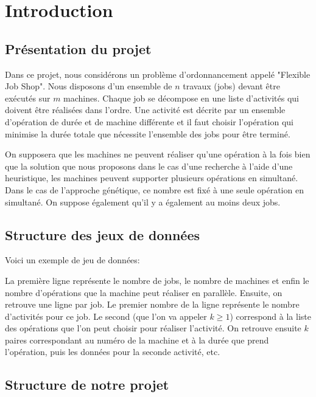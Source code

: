 \section{Introduction}

\subsection{Présentation du projet}

Dans ce projet, nous considérons un problème d'ordonnancement appelé "Flexible Job Shop". Nous disposons d'un ensemble de $n$ travaux (jobs) devant être exécutés sur $m$ machines. Chaque job se décompose en une liste d'activités qui doivent être réalisées dans l'ordre. Une activité est décrite par un ensemble d'opération de durée et de machine différente et il faut choisir l'opération qui minimise la durée totale que nécessite l'ensemble des jobs pour être terminé.

On supposera que les machines ne peuvent réaliser qu'une opération à la fois bien que la solution que nous proposons dans le cas d'une recherche à l'aide d'une heuristique, les machines peuvent supporter plusieurs opérations en simultané. Dans le cas de l'approche génétique, ce nombre est fixé à une seule opération en simultané. On suppose également qu'il y a également au moins deux jobs.

\subsection{Structure des jeux de données}

Voici un exemple de jeu de données:


La première ligne représente le nombre de jobs, le nombre de machines et enfin le nombre d'opérations que la machine peut réaliser en parallèle. Ensuite, on retrouve une ligne par job. Le premier nombre de la ligne représente le nombre d'activités pour ce job. Le second (que l'on va appeler $k \geq 1$) correspond à la liste des opérations que l'on peut choisir pour réaliser l'activité. On retrouve ensuite $k$ paires correspondant au numéro de la machine et à la durée que prend l'opération, puis les données pour la seconde activité, etc. 

\subsection{Structure de notre projet}

